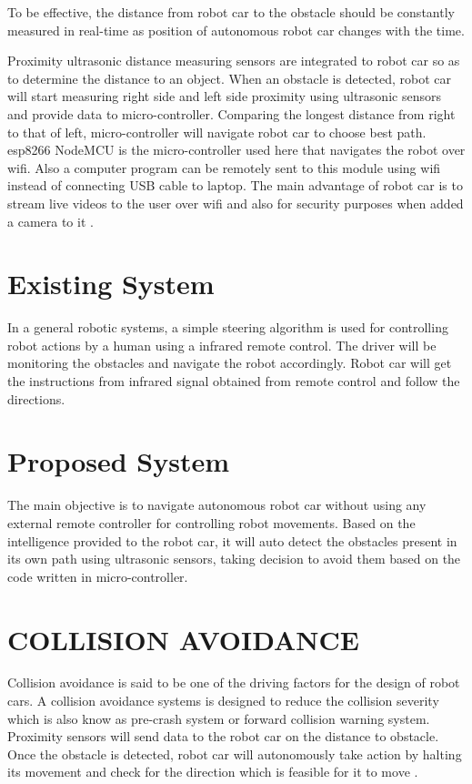 \documentclass[sigconf]{acmart}
\begin{document}
To be effective, the distance from robot car to the obstacle should be constantly 
measured in real-time as position of autonomous robot car changes with the time.

Proximity ultrasonic distance measuring sensors are integrated to robot car so as to 
determine the distance to an object. When an obstacle is detected, robot car will start 
measuring right side and left side proximity using ultrasonic sensors and provide data 
to micro-controller. Comparing the longest distance from right to that of left, 
micro-controller will navigate robot car to choose best path. esp8266 NodeMCU is 
the micro-controller used here that navigates the robot over wifi. Also a computer 
program can be remotely sent to this module using wifi instead of connecting USB 
cable to laptop. The main advantage of robot car is to stream live videos to the 
user over wifi and also for security purposes when added a camera to it \cite{gregor2017}.

\section{Existing System}
In a general robotic systems, a simple steering algorithm is used for controlling 
robot actions by a human using a infrared remote control. The driver will be monitoring 
the obstacles and navigate the robot accordingly. Robot car will get the instructions 
from infrared signal obtained from remote control and follow the directions.

\section{Proposed System}
The main objective is to navigate autonomous robot car without using any external remote 
controller for controlling robot movements. Based on the intelligence provided to the 
robot car, it will auto detect the obstacles present in its own path using ultrasonic 
sensors, taking decision to avoid them based on the code written in micro-controller.

\section{COLLISION AVOIDANCE}
Collision avoidance is said to be one of the driving factors for the design of robot cars. 
A collision avoidance systems is designed to reduce the collision severity which is also 
know as pre-crash system or forward collision warning system. Proximity sensors will send 
data to the robot car on the distance to obstacle. Once the obstacle is detected, robot  
car will autonomously take action by halting its movement and check for the direction which 
is feasible for it to move \cite{stratis2009}. 
\end{document}
